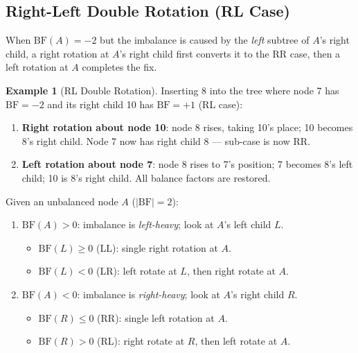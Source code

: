 \documentclass[11pt, a4paper, notitlepage]{report}
\theoremstyle{definition}
\theoremstyle{remark}
\theoremstyle{definition}
\newtheorem{example}[theorem]{Example}
\begin{document}
\subsection{Right-Left Double Rotation (RL Case)}
\label{subsec:rl-rotation}

When $\text{BF}(A) = -2$ but the imbalance is caused by the \emph{left} subtree of $A$'s
right child, a right rotation at $A$'s right child first converts it to the RR case, then
a left rotation at $A$ completes the fix.

\begin{example}[RL Double Rotation]
\label{ex:rl-rotate}
Inserting 8 into the tree where node 7 has $\text{BF} = -2$ and its right child 10 has
$\text{BF} = +1$ (RL case):
\begin{enumerate}
  \item \textbf{Right rotation about node 10}: node 8 rises, taking 10's place; 10 becomes
        8's right child.  Node 7 now has right child 8 --- sub-case is now RR.
  \item \textbf{Left rotation about node 7}: node 8 rises to 7's position; 7 becomes 8's
        left child; 10 is 8's right child.  All balance factors are restored.
\end{enumerate}
\end{example}

\begin{examtip}[title={Exam Tip: Identifying the Rotation Case Quickly}]
Given an unbalanced node $A$ ($|\text{BF}| = 2$):
\begin{enumerate}
  \item $\text{BF}(A) > 0$: imbalance is \emph{left-heavy}; look at $A$'s left child $L$.
  \begin{itemize}
    \item $\text{BF}(L) \geq 0$ (LL): single right rotation at $A$.
    \item $\text{BF}(L) < 0$ (LR): left rotate at $L$, then right rotate at $A$.
  \end{itemize}
  \item $\text{BF}(A) < 0$: imbalance is \emph{right-heavy}; look at $A$'s right child $R$.
  \begin{itemize}
    \item $\text{BF}(R) \leq 0$ (RR): single left rotation at $A$.
    \item $\text{BF}(R) > 0$ (RL): right rotate at $R$, then left rotate at $A$.
  \end{itemize}
\end{enumerate}
\end{examtip}
\end{document}
